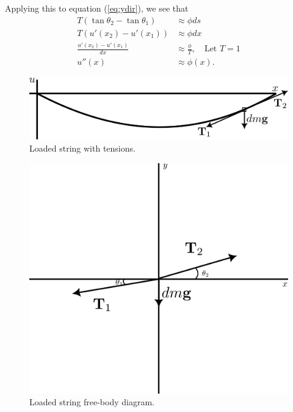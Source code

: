     Applying this to equation (\ref{eq:ydir}), we see that 
    \begin{equation*}
        \begin{split}
            T(\tan\theta_2-\tan\theta_1) &\approx \phi ds\\
            T(u'(x_2)-u'(x_1)) & \approx \phi dx\\
            \frac{u'(x_2)-u'(x_1)}{dx} &\approx \frac{\phi}{T},\quad \text{Let } T=1\\
            u''(x)&\approx \phi(x).
        \end{split}
    \end{equation*}
    \begin{figure}
        \centering
        \includegraphics[width=0.6\linewidth]{include/loadtension1.png}
        \caption{Loaded string with tensions.}
    \end{figure}

    \begin{figure}
        \centering
        \includegraphics[width=0.6\linewidth]{include/loadtension2.png}
        \caption{Loaded string free-body diagram.}
    \end{figure}

    
    
